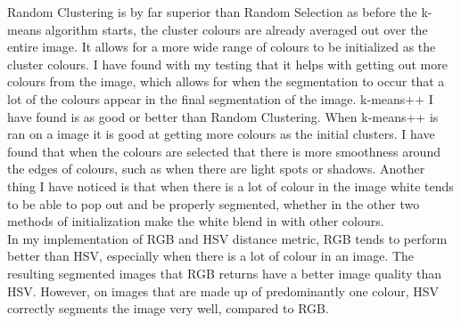 \documentclass{article}
\begin{document}
Random Clustering is by far superior than Random Selection as before
the k-means algorithm starts, the cluster colours are already averaged out over
the entire image. It allows for a more wide range of colours to be initialized
as the cluster colours. I have found with my testing that it helps with getting
out more colours from the image, which allows for when the segmentation to occur
that a lot of the colours appear in the final segmentation of the image.
k-means++ I have found is as good or better than Random Clustering. When
k-means++ is ran on a image it is good at getting more colours as the initial
clusters. I have found that when the colours are selected that there is more
smoothness around the edges of colours, such as when there are light spots or
shadows. Another thing I have noticed is that when there is a lot of colour in
the image white tends to be able to pop out and be properly segmented, whether
in the other two methods of initialization make the white blend in with other
colours.\\

In my implementation of RGB and HSV distance metric, RGB tends to perform better
than HSV, especially when there is a lot of colour in an image. The resulting
segmented images that RGB returns have a better image quality than HSV. However,
on images that are made up of predominantly one colour, HSV correctly segments
the image very well, compared to RGB.

\end{document}
